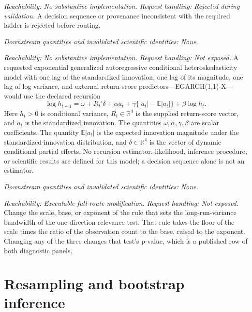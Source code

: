 \documentclass[11pt]{article}
\begin{document}
\begin{description}[style=nextline]
\item[Inconsistent dynamic-model decisions.]
\emph{Reachability: No substantive implementation. Request handling: Rejected during validation.}
A decision sequence or provenance inconsistent with the required ladder is rejected before routing.

\emph{Downstream quantities and invalidated scientific identities: None.}

\item[Dynamic conditional-scale estimation.]
\emph{Reachability: No substantive implementation. Request handling: Not exposed.}
A requested exponential generalized autoregressive conditional heteroskedasticity model with one
lag of the standardized innovation, one lag of its magnitude, one lag of log variance, and external
return-score predictors---EGARCH(1,1)-X---would use the declared recursion
\[
 \log h_{t+1}=\omega+R_t'\delta+\alpha a_t
 +\gamma\{|a_t|-\mathbb E|a_t|\}+\beta\log h_t.
\]
Here \(h_t>0\) is conditional variance, \(R_t\in\mathbb R^4\) is the supplied return-score vector,
and \(a_t\) is the standardized innovation. The quantities \(\omega,\alpha,\gamma,\beta\) are scalar
coefficients. The quantity \(\mathbb E|a_t|\) is the expected innovation magnitude under the
standardized-innovation distribution, and \(\delta\in\mathbb R^4\) is the vector of dynamic
conditional partial effects. No recursion
estimator, likelihood, inference procedure, or scientific results are defined for this model; a
decision sequence alone is not an estimator.

\emph{Downstream quantities and invalidated scientific identities: None.}

\item[One-direction relevance long-run-variance bandwidth.]
\emph{Reachability: Executable full-route modification. Request handling: Not exposed.}
Change the scale, base, or exponent of the rule that sets the long-run-variance bandwidth of the
one-direction relevance test. That rule takes the floor of the scale times the ratio of the
observation count to the base, raised to the exponent. Changing any of the three changes that test's p-value, which is a published
row of both diagnostic panels.

\end{description}

\section{Resampling and bootstrap inference}
\end{document}
